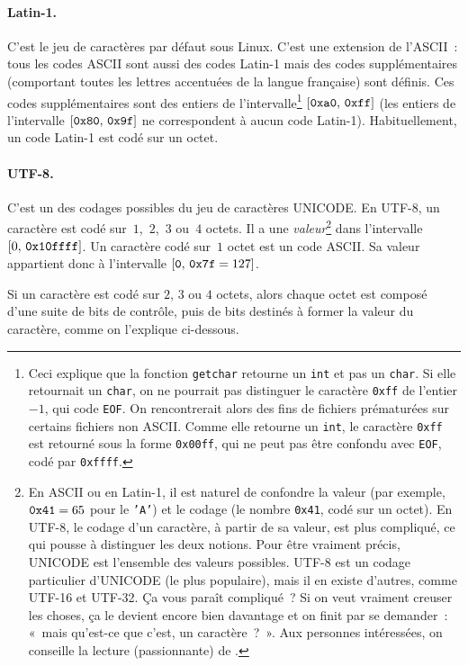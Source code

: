 \documentclass[12pt]{article}
\begin{document}
\paragraph{Latin-1.} C'est le jeu de caractères par défaut sous Linux.
C'est une extension de l'ASCII~: tous les codes ASCII sont aussi
des codes Latin-1 mais des codes supplémentaires (comportant toutes
les lettres accentuées de la langue française) sont définis. Ces codes
supplémentaires sont des entiers de l'intervalle\footnote{Ceci
explique que la fonction {\tt getchar} retourne un {\tt int}
et pas un {\tt char}. Si elle retournait un {\tt char}, on ne pourrait
pas distinguer le caractère {\tt 0xff} de l'entier $-1$, qui code {\tt EOF}.
On rencontrerait alors des fins de fichiers prématurées sur certains
fichiers non ASCII.
Comme elle retourne un {\tt int}, le caractère {\tt 0xff} est retourné
sous la forme {\tt 0x00ff}, qui ne peut pas être confondu avec {\tt EOF},
codé par {\tt 0xffff}.}
$[\mbox{\tt 0xa0},\, \mbox{\tt 0xff}]$ (les entiers de l'intervalle 
$[\mbox{\tt 0x80},\, \mbox{\tt 0x9f}]$ ne correspondent à aucun
code Latin-1). Habituellement, un code Latin-1 est codé sur un octet.
\paragraph{UTF-8.} C'est un des codages possibles du jeu de caractères
UNICODE. En UTF-8, un caractère est codé sur~$1$,~$2$,~$3$ ou~$4$
octets. Il a une {\em valeur}\footnote{En ASCII ou en Latin-1, il est
naturel de confondre la valeur (par exemple, $\mbox{\tt 0x41} = 65$
pour le {\tt 'A'}) et le codage (le nombre {\tt 0x41}, codé sur un octet).
En UTF-8, le codage d'un caractère, à partir de sa valeur, est plus compliqué,
ce qui pousse à distinguer les deux notions. Pour être vraiment précis,
UNICODE est l'ensemble des valeurs possibles. UTF-8 est un codage
particulier d'UNICODE (le plus populaire), mais il en existe d'autres, 
comme UTF-16 et UTF-32. Ça vous paraît compliqué~? Si on veut vraiment
creuser les choses, ça le devient encore bien davantage et on finit par
se demander~: «~mais qu'est-ce que c'est, un caractère~?~». Aux personnes
intéressées, on conseille la lecture (passionnante) de \cite{Korpela01}.} 
dans l'intervalle $[0,\, \mbox{\tt 0x10ffff}]$.
Un caractère codé sur~$1$ octet est un code ASCII. Sa valeur
appartient donc à l'intervalle $[\mbox{\tt 0},\, \mbox{\tt 0x7f} = 127]$.

Si un caractère est codé sur $2$, $3$ ou $4$ octets, alors chaque
octet est composé d'une suite de bits de contrôle, puis de
bits destinés à former la valeur du caractère, comme on l'explique
ci-dessous.
\end{document}
